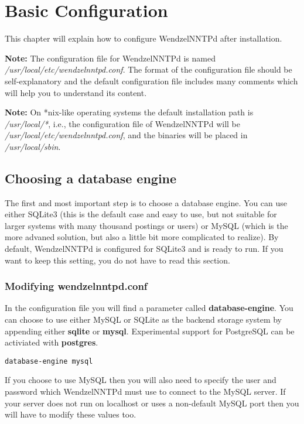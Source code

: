 \chapter{Basic Configuration}\label{Ch:Config}

This chapter will explain how to configure WendzelNNTPd after installation.

\textbf{Note:} The configuration file for WendzelNNTPd is named \textit{/usr/local/etc/wendzelnntpd.conf}. The format of the configuration file should be self-explanatory and the default configuration file includes many comments which will help you to understand its content.

\textbf{Note:} On *nix-like operating systems the default installation path is \textit{/usr/local/*}, i.e., the configuration file of WendzelNNTPd will be \textit{/usr/local/etc/wendzelnntpd.conf}, and the binaries will be placed in \textit{/usr/local/sbin}. %

\section{Choosing a database engine}

The first and most important step is to choose a database engine. You can use either SQLite3 (this is the default case and easy to use, but not suitable for larger systems with many thousand postings or users) or MySQL (which is the more advaned solution, but also a little bit more complicated to realize). By default, WendzelNNTPd is configured for SQLite3 and is ready to run. If you want to keep this setting, you do not have to read this section.

\subsection{Modifying wendzelnntpd.conf}

In the configuration file you will find a parameter called \textbf{database-engine}. You can choose to use either MySQL or SQLite as the backend storage system by appending either \textbf{sqlite} or \textbf{mysql}. Experimental support for PostgreSQL can be activiated with \textbf{postgres}.

\begin{verbatim}
database-engine mysql
\end{verbatim}

If you choose to use MySQL then you will also need to specify the user and password which WendzelNNTPd must use to connect to the MySQL server. If your server does not run on localhost or uses a non-default MySQL port then you will have to modify these values too.

